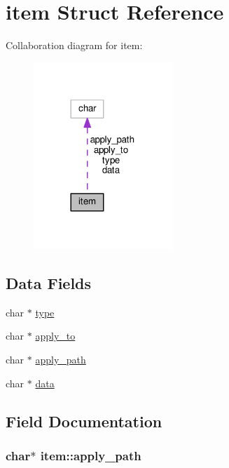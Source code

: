 \hypertarget{structitem}{}\section{item Struct Reference}
\label{structitem}


Collaboration diagram for item\+:
\nopagebreak
\begin{figure}[H]
\begin{center}
\leavevmode
\includegraphics[width=149pt]{structitem__coll__graph}
\end{center}
\end{figure}
\subsection*{Data Fields}
\begin{DoxyCompactItemize}
\item 
char $\ast$ \hyperlink{structitem_af87efd5ddd0a63f3135ca571c3477dad}{type}
\item 
char $\ast$ \hyperlink{structitem_ad5eb974ccaab2a13ab204a4969e5b383}{apply\+\_\+to}
\item 
char $\ast$ \hyperlink{structitem_acae91540672074f2d066548b8344bfeb}{apply\+\_\+path}
\item 
char $\ast$ \hyperlink{structitem_a24e717f0cfeb9dcd279549a4c428d4e2}{data}
\end{DoxyCompactItemize}


\subsection{Field Documentation}
\subsubsection[{\texorpdfstring{apply\+\_\+path}{apply_path}}]{\setlength{\rightskip}{0pt plus 5cm}char$\ast$ item\+::apply\+\_\+path}\hypertarget{structitem_acae91540672074f2d066548b8344bfeb}{}\label{structitem_acae91540672074f2d066548b8344bfeb}
